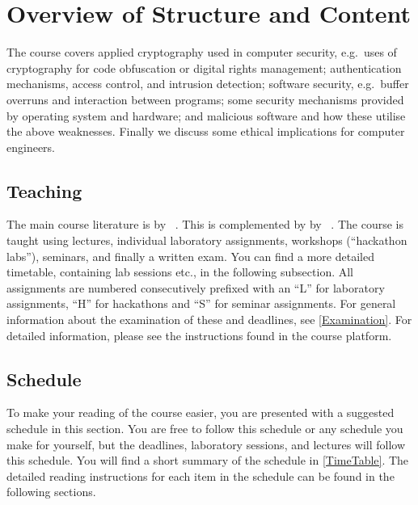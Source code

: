 \section{Overview of Structure and Content}
\label{sec:outline}
The course covers
applied cryptography used in computer security, e.g.~uses of cryptography for 
code obfuscation or digital rights management;
authentication mechanisms, access control, and intrusion detection;
software security, e.g.~buffer overruns and interaction between programs;
some security mechanisms provided by operating system and hardware;
and malicious software and how these utilise the above weaknesses.
Finally we discuss some ethical implications for computer engineers.

\subsection{Teaching}

The main course literature is  by 
\citeauthor{Gollmann2011cs}~\cite{Gollmann2011cs}.
This is complemented by  by 
\citeauthor{Anderson2008sea}~\cite{Anderson2008sea}.
The course is taught using lectures, individual laboratory assignments, 
workshops (\enquote{hackathon labs}), seminars, and finally a written exam.
You can find a more detailed timetable, containing lab sessions etc., in the 
following subsection.
All assignments are numbered consecutively prefixed with an \enquote{L} for 
laboratory assignments, \enquote{H} for hackathons and \enquote{S} for seminar 
assignments.
For general information about the examination of these and deadlines, see 
\cref{Examination}.
For detailed information, please see the instructions found in the course 
platform.


\subsection{Schedule}
\label{Schedule}
To make your reading of the course easier, you are presented with a suggested 
schedule in this section.
You are free to follow this schedule or any schedule you make for yourself, but 
the deadlines, laboratory sessions, and lectures will follow this schedule.
You will find a short summary of the schedule in \cref{TimeTable}.
The detailed reading instructions for each item in the schedule can be found in 
the following sections.

